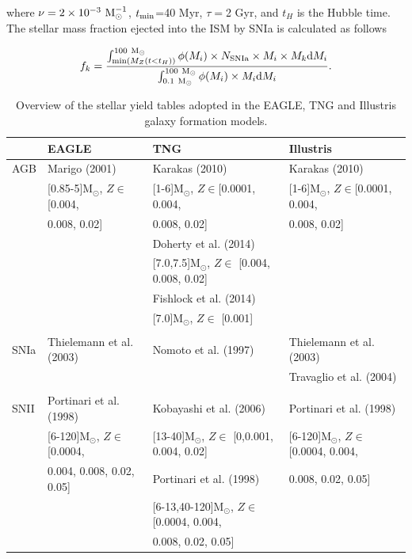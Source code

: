 \documentclass[11pt,a4paper,fleqn,usenatbib,twocolumn]{mnras}
\begin{document}
\noindent where $\nu=2\times 10^{-3}~\rm{M}_{\odot}^{-1}$, $t_{\rm{min}}$=40 Myr, $\tau=$2 Gyr, and $t_{H}$ is the Hubble time. The stellar mass fraction ejected into the ISM by SNIa is calculated as follows

\begin{equation}
f_{k} = \frac{\int_{{\rm{min}}(M_{Z}(t<t_{H}))}^{100~{\rm{M}}_{\odot}}  \phi(M_{i})\times N_{\rm{SNIa}}\times M_{i}\times M_{k} {\rm{d}}M_{i}}{\int_{0.1~{\rm{M}}_{\odot}}^{100~{\rm{M}}_{\odot}} \phi(M_{i})\times M_{i}{\rm{d}}M_{i}}.
\end{equation}

\begin{table}
\begin{center}
\begin{tabular}{l|l|l|l}
\hline
& EAGLE & TNG & Illustris\\
\hline
AGB & Marigo (2001) & Karakas (2010) & Karakas (2010) \\
& [0.85-5]M$_{\odot}$, $Z{\in}$[0.004, & [1-6]M$_{\odot}$, $Z{\in}$[0.0001, 0.004, & [1-6]M$_{\odot}$, $Z{\in}$[0.0001, 0.004, \\
& 0.008, 0.02] & 0.008, 0.02] & 0.008, 0.02]\\
&  & Doherty et al. (2014)  &\\
&  & [7.0,7.5]M$_{\odot}$, $Z{\in}$ [0.004, 0.008, 0.02]&\\
&  & Fishlock et al. (2014) & \\
&  & [7.0]M$_{\odot}$, $Z{\in}$ [0.001] &\\\\
SNIa & Thielemann et al. (2003) & Nomoto et al. (1997) & Thielemann et al. (2003)\\
& & & Travaglio et al. (2004)\\\\
SNII &  Portinari et al. (1998) & Kobayashi et al. (2006) & Portinari et al. (1998) \\
& [6-120]M$_{\odot}$, $Z{\in}$ [0.0004, & [13-40]M$_{\odot}$, $Z{\in}$ [0,0.001, 0.004, 0.02] & [6-120]M$_{\odot}$, $Z{\in}$ [0.0004, 0.004,\\
& 0.004, 0.008, 0.02, 0.05] & Portinari et al. (1998) & 0.008, 0.02, 0.05]  \\
& & [6-13,40-120]M$_{\odot}$, $Z{\in}$ [0.0004, 0.004, \\
& & 0.008, 0.02, 0.05]\\
\hline
\end{tabular}
\end{center}
\caption{Overview of the stellar yield tables adopted in the EAGLE, TNG and Illustris galaxy formation models.}
\label{YieldTables}
\end{table}
\end{document}
